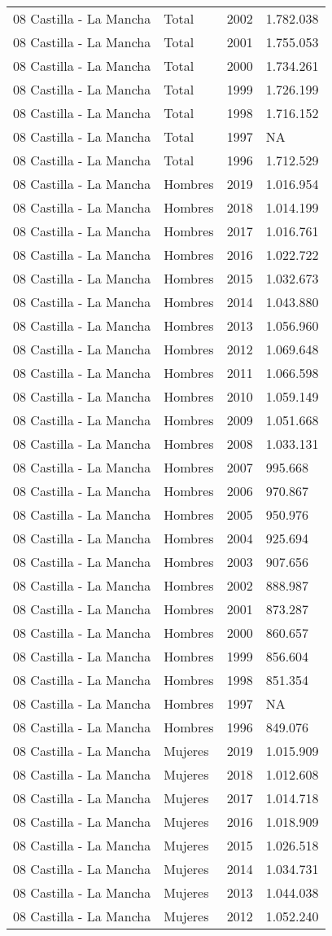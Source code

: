 \documentclass[
]{article}
\begin{document}
\begin{longtable}[]{@{}llrl@{}}
08 Castilla - La Mancha & Total & 2002 & 1.782.038\tabularnewline
08 Castilla - La Mancha & Total & 2001 & 1.755.053\tabularnewline
08 Castilla - La Mancha & Total & 2000 & 1.734.261\tabularnewline
08 Castilla - La Mancha & Total & 1999 & 1.726.199\tabularnewline
08 Castilla - La Mancha & Total & 1998 & 1.716.152\tabularnewline
08 Castilla - La Mancha & Total & 1997 & NA\tabularnewline
08 Castilla - La Mancha & Total & 1996 & 1.712.529\tabularnewline
08 Castilla - La Mancha & Hombres & 2019 & 1.016.954\tabularnewline
08 Castilla - La Mancha & Hombres & 2018 & 1.014.199\tabularnewline
08 Castilla - La Mancha & Hombres & 2017 & 1.016.761\tabularnewline
08 Castilla - La Mancha & Hombres & 2016 & 1.022.722\tabularnewline
08 Castilla - La Mancha & Hombres & 2015 & 1.032.673\tabularnewline
08 Castilla - La Mancha & Hombres & 2014 & 1.043.880\tabularnewline
08 Castilla - La Mancha & Hombres & 2013 & 1.056.960\tabularnewline
08 Castilla - La Mancha & Hombres & 2012 & 1.069.648\tabularnewline
08 Castilla - La Mancha & Hombres & 2011 & 1.066.598\tabularnewline
08 Castilla - La Mancha & Hombres & 2010 & 1.059.149\tabularnewline
08 Castilla - La Mancha & Hombres & 2009 & 1.051.668\tabularnewline
08 Castilla - La Mancha & Hombres & 2008 & 1.033.131\tabularnewline
08 Castilla - La Mancha & Hombres & 2007 & 995.668\tabularnewline
08 Castilla - La Mancha & Hombres & 2006 & 970.867\tabularnewline
08 Castilla - La Mancha & Hombres & 2005 & 950.976\tabularnewline
08 Castilla - La Mancha & Hombres & 2004 & 925.694\tabularnewline
08 Castilla - La Mancha & Hombres & 2003 & 907.656\tabularnewline
08 Castilla - La Mancha & Hombres & 2002 & 888.987\tabularnewline
08 Castilla - La Mancha & Hombres & 2001 & 873.287\tabularnewline
08 Castilla - La Mancha & Hombres & 2000 & 860.657\tabularnewline
08 Castilla - La Mancha & Hombres & 1999 & 856.604\tabularnewline
08 Castilla - La Mancha & Hombres & 1998 & 851.354\tabularnewline
08 Castilla - La Mancha & Hombres & 1997 & NA\tabularnewline
08 Castilla - La Mancha & Hombres & 1996 & 849.076\tabularnewline
08 Castilla - La Mancha & Mujeres & 2019 & 1.015.909\tabularnewline
08 Castilla - La Mancha & Mujeres & 2018 & 1.012.608\tabularnewline
08 Castilla - La Mancha & Mujeres & 2017 & 1.014.718\tabularnewline
08 Castilla - La Mancha & Mujeres & 2016 & 1.018.909\tabularnewline
08 Castilla - La Mancha & Mujeres & 2015 & 1.026.518\tabularnewline
08 Castilla - La Mancha & Mujeres & 2014 & 1.034.731\tabularnewline
08 Castilla - La Mancha & Mujeres & 2013 & 1.044.038\tabularnewline
08 Castilla - La Mancha & Mujeres & 2012 & 1.052.240\tabularnewline

\end{longtable}
\end{document}

